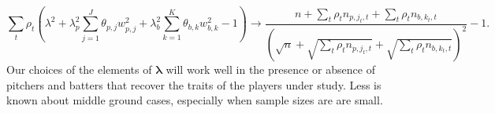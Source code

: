 \documentclass[12pt]{article}
\newcommand{\lambdabf}{\boldsymbol{\lambda}}
\begin{document}
$$
  \sum_t\rho_t\left(\lambda^2 + \lambda_p^2 \sum_{j=1}^J \theta_{p,j}w_{p,j}^2
    + \lambda_b^2 \sum_{k=1}^K \theta_{b,k}w_{b,k}^2 - 1\right) \longrightarrow
    \frac{n + \sum_t\rho_tn_{p,j_t,t} + \sum_t\rho_tn_{b,k_t,t}}
      {(\sqrt{n}
        + \sqrt{\sum_t\rho_tn_{p,j_t,t}} + \sqrt{\sum_t\rho_tn_{b,k_t,t}})^2} - 1.
$$
Our choices of the elements of $\lambdabf$ will work well in the presence or absence of pitchers and batters that recover the traits of the players under study. Less is known about middle ground cases, especially when sample sizes are are small.
\end{document}
